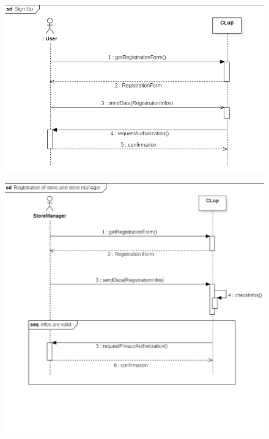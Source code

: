 \documentclass{article}
\begin{document}
\begin{figure}[H]
  \includegraphics[width=\linewidth]{SignUpSequence.png}
  
\end{figure}

\begin{figure}[H]
  \includegraphics[width=\linewidth]{RegistrationSequence.png}
  
\end{figure}
\end{document}
